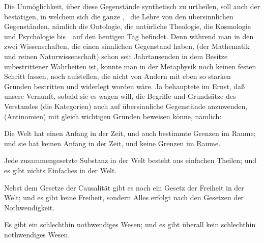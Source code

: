 \begin{aufza}
\item Die Unmöglichkeit, über diese Gegenstände synthetisch zu urtheilen, soll auch der  bestätigen, in welchem sich die ganze , \dh\ die Lehre von den übersinnlichen Gegenständen, nämlich die Ontologie, die natürliche Theologie, die Kosmologie und Psychologie bis~\ auf den heutigen Tag befindet. Denn während man in den zwei Wissenschaften, die einen sinnlichen Gegenstand haben, (der Mathematik und reinen Naturwissenschaft) schon seit Jahrtausenden in dem Besitze unbestrittener Wahrheiten ist, konnte man in der Metaphysik noch keinen festen Schritt fassen, noch  aufstellen, die nicht von Andern mit eben so starken Gründen bestritten und widerlegt worden wäre. Ja  behauptete im Ernst, daß unsere Vernunft, sobald sie es wagen will, die Begriffe und Grundsätze des Verstandes (die Kategorien) auch auf übersinnliche Gegenstände anzuwenden,  (Antinomien) mit gleich wichtigen Gründen beweisen könne, nämlich:
\begin{aufzb}[1.]
\item Die Welt hat einen Anfang in der Zeit, und auch bestimmte Grenzen im Raume; und sie hat keinen Anfang in der Zeit, und keine Grenzen im Raume.
\item Jede zusammengesetzte Substanz in der Welt besteht aus einfachen Theilen; und es gibt nichts Einfaches in der Welt.
\item Nebst dem Gesetze der Causalität gibt es noch ein Gesetz der Freiheit in der Welt; und es gibt keine Freiheit, sondern Alles erfolgt nach den Gesetzen der Nothwendigkeit.
\item Es gibt ein schlechthin nothwendiges Wesen; und es gibt überall kein schlechthin nothwendiges Wesen.
\end{aufzb}

\end{aufza}
